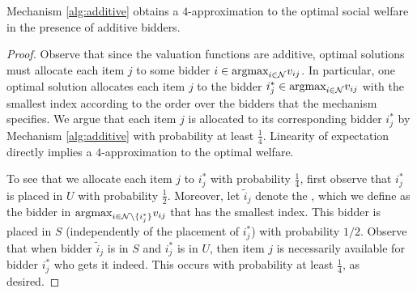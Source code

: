 \begin{lemma}\label{lem-add-approx}
Mechanism \ref{alg:additive} obtains a $4$-approximation to the optimal social welfare in the presence of additive bidders.
\end{lemma}
\begin{proof}
Observe that since the valuation functions are additive,  optimal solutions must allocate each item $j$ to some bidder $i \in \text{argmax}_{i \in \mathcal{N}}{v_{ij}}$.  In particular, one optimal solution allocates each item $j$ to the bidder $i^*_j \in \text{argmax}_{i \in \mathcal{N}}{v_{ij}}$ with the smallest index according to the order over the bidders that the mechanism specifies.  We argue that each item $j$ is allocated to its corresponding bidder $i^*_j$ by Mechanism \ref{alg:additive} with probability at least $\frac 1 4$. Linearity of expectation directly implies a $4$-approximation to the optimal welfare.

To see that we allocate each item $j$ to
$i^*_j$
with probability $\frac 1 4$, first observe that $i^*_j$ is placed in $U$ with probability $\frac 1 2$.  Moreover, let $\tilde{i}_j$ denote the , which we define as
the bidder in $\text{argmax}_{i \in \mathcal{N} \setminus \{i^*_j\}}{v_{ij}}$
that has the smallest index.
 This bidder is placed in $S$ (independently of the placement of $i^*_j$) with probability $1/2$.  
Observe that when bidder $\tilde{i}_j$ is in $S$ and $i^*_j$ is in $U$,
then item $j$ is necessarily available for bidder $i^*_j$ who gets it indeed. 
This occurs with probability at least $\frac{1}{4}$, as desired.\qedhere
\end{proof}






